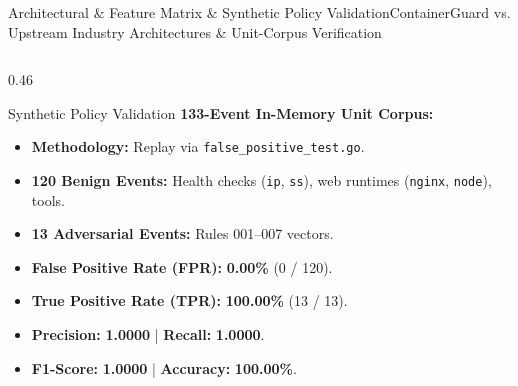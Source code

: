 \documentclass[aspectratio=169,10pt]{beamer}
\begin{document}
\begin{frame}{Architectural \& Feature Matrix \& Synthetic Policy Validation}{ContainerGuard vs. Upstream Industry Architectures \& Unit-Corpus Verification}
\begin{columns}[T]
    \begin{column}{0.46\textwidth}
      \begin{exampleblock}{Synthetic Policy Validation}
        \scriptsize
        \textbf{133-Event In-Memory Unit Corpus:}
        \begin{itemize}
          \item \textbf{Methodology:} Replay via \texttt{false\_positive\_test.go}.
          \item \textbf{120 Benign Events:} Health checks (\texttt{ip}, \texttt{ss}), web runtimes (\texttt{nginx}, \texttt{node}), tools.
          \item \textbf{13 Adversarial Events:} Rules 001--007 vectors.
          \item \textbf{False Positive Rate (FPR):} \textbf{0.00\%} (0 / 120).
          \item \textbf{True Positive Rate (TPR):} \textbf{100.00\%} (13 / 13).
          \item \textbf{Precision:} \textbf{1.0000} | \textbf{Recall:} \textbf{1.0000}.
          \item \textbf{F1-Score:} \textbf{1.0000} | \textbf{Accuracy:} \textbf{100.00\%}.
        \end{itemize}
      \end{exampleblock}
    \end{column}
  \end{columns}
\end{frame}
\end{document}
